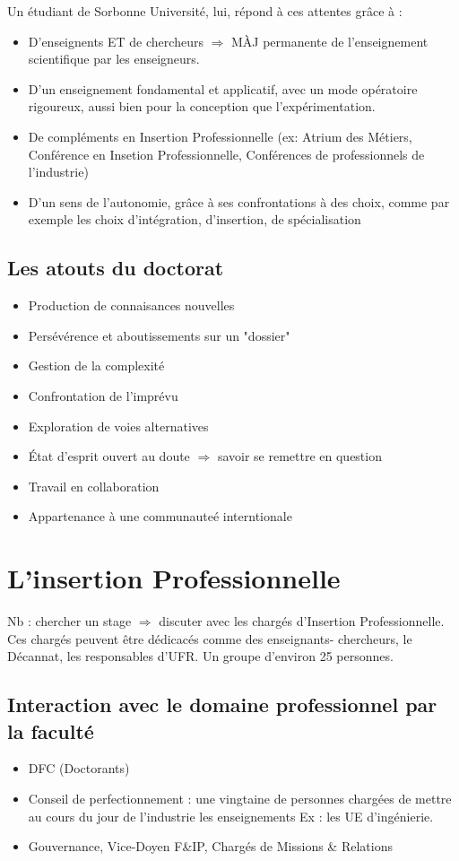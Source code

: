 \documentclass[10pt]{article}
\begin{document}
Un étudiant de Sorbonne Université, lui, répond à ces attentes grâce à :
\begin{itemize}
  \item D'enseignents ET de chercheurs $\Rightarrow$ MÀJ permanente de l'enseignement
scientifique par les enseigneurs.
  \item D'un enseignement fondamental et applicatif, avec un mode opératoire
rigoureux, aussi bien pour la conception que l'expérimentation.
  \item De compléments en Insertion Professionnelle (ex: Atrium des Métiers,
Conférence en Insetion Professionnelle, Conférences de professionnels de l'industrie)
  \item D'un sens de l'autonomie, grâce à ses confrontations à des choix, comme
par exemple les choix d'intégration, d'insertion, de spécialisation
\end{itemize}

\subsection{Les atouts du doctorat}
\begin{itemize}
  \item Production de connaisances nouvelles
  \item Persévérence et aboutissements sur un "dossier"
  \item Gestion de la complexité
  \item Confrontation de l'imprévu
  \item Exploration de voies alternatives
  \item État d'esprit ouvert au doute $\Rightarrow$ savoir se remettre en question
  \item Travail en collaboration
  \item Appartenance à une communauteé interntionale
\end{itemize}
\section{L'insertion Professionnelle}

Nb : chercher un stage $\Rightarrow$ discuter avec les chargés d'Insertion
Professionnelle. Ces chargés peuvent être dédicacés comme des enseignants-
chercheurs, le Décannat, les responsables d'UFR. Un groupe d'environ 25
personnes.

\subsection{Interaction avec le domaine professionnel par la faculté}
\begin{itemize}
  \item DFC (Doctorants)
  \item Conseil de perfectionnement : une vingtaine de personnes chargées de
mettre au cours du jour de l'industrie les enseignements Ex : les UE d'ingénierie.
  \item Gouvernance, Vice-Doyen F\&IP, Chargés de Missions \& Relations
\end{itemize}
\end{document}

